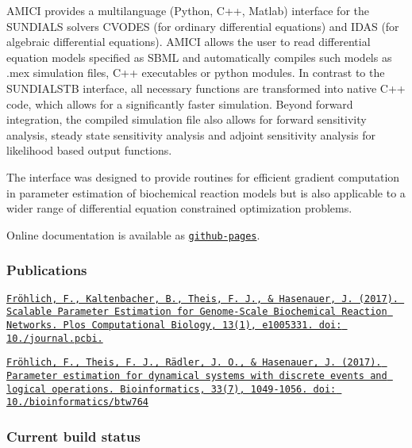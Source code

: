 A\+M\+I\+CI provides a multilanguage (Python, C++, Matlab) interface for the S\+U\+N\+D\+I\+A\+LS solvers C\+V\+O\+D\+ES (for ordinary differential equations) and I\+D\+AS (for algebraic differential equations). A\+M\+I\+CI allows the user to read differential equation models specified as S\+B\+ML and automatically compiles such models as .mex simulation files, C++ executables or python modules. In contrast to the S\+U\+N\+D\+I\+A\+L\+S\+TB interface, all necessary functions are transformed into native C++ code, which allows for a significantly faster simulation. Beyond forward integration, the compiled simulation file also allows for forward sensitivity analysis, steady state sensitivity analysis and adjoint sensitivity analysis for likelihood based output functions.

The interface was designed to provide routines for efficient gradient computation in parameter estimation of biochemical reaction models but is also applicable to a wider range of differential equation constrained optimization problems.

Online documentation is available as \href{http://icb-dcm.github.io/AMICI/}{\tt github-\/pages}.

\subsubsection*{Publications}

\href{https://zenodo.org/badge/latestdoi/43677177}{\tt }

\href{https://doi.org/10.1371/journal.pcbi.1005331}{\tt Fröhlich, F., Kaltenbacher, B., Theis, F. J., \& Hasenauer, J. (2017). Scalable Parameter Estimation for Genome-\/\+Scale Biochemical Reaction Networks. Plos Computational Biology, 13(1), e1005331. doi\+: 10./journal.pcbi.}

\href{https://doi.org/10.1093/bioinformatics/btw764}{\tt Fröhlich, F., Theis, F. J., Rädler, J. O., \& Hasenauer, J. (2017). Parameter estimation for dynamical systems with discrete events and logical operations. Bioinformatics, 33(7), 1049-\/1056. doi\+: 10./bioinformatics/btw764}

\subsubsection*{Current build status}

\href{https://badge.fury.io/py/amici}{\tt } \href{https://travis-ci.org/ICB-DCM/AMICI}{\tt } \href{https://codecov.io/gh/ICB-DCM/AMICI}{\tt } \href{https://www.codacy.com/app/FFroehlich/AMICI?utm_source=github.com&amp;utm_medium=referral&amp;utm_content=ICB-DCM/AMICI&amp;utm_campaign=Badge_Grade}{\tt } 